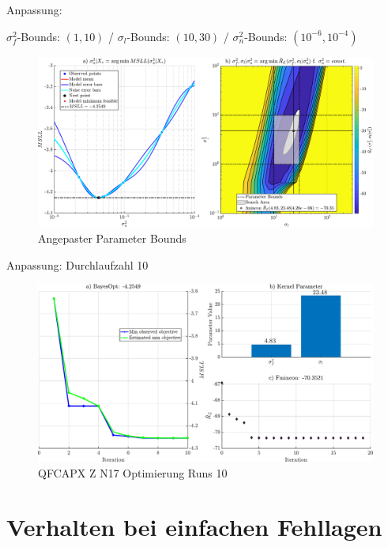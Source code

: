 Anpassung:

$\sigma_f^2$-Bounds: $(1, 10)$ / $\sigma_l$-Bounds: $(10, 30)$ / $\sigma_n^2$-Bounds: $(10^{-6}, 10^{-4})$


\begin{figure}[tbph]
	\centering
	\includegraphics[width=\linewidth]{appendix/images/8-Ergebnisse-Experimente/QFCAPX-Z-N17-Bounds}
	\caption[Angepaster Parameter Bounds]{Angepaster Parameter Bounds}
	\label{fig:qfcapx-z-n17-bounds}
\end{figure}


Anpassung: Durchlaufzahl 10


\begin{figure}[tbph]
	\centering
	\includegraphics[width=\linewidth]{appendix/images/8-Ergebnisse-Experimente/QFCAPX-Z-N17-Opt}
	\caption[QFCAPX Z N17 Optimierung Runs 10]{QFCAPX Z N17 Optimierung Runs 10}
	\label{fig:qfcapx-z-n17-opt}
\end{figure}





\clearpage


\section{Verhalten bei einfachen Fehllagen}\label{sec:ergexp5}


